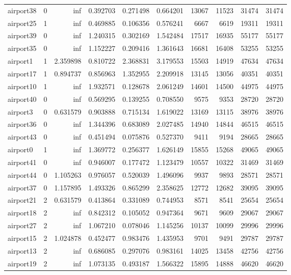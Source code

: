 \begin{longtable}{|l|r|r|r|r|r|r|r|r|r|}
airport38 & 0 & inf & 0.392703 & 0.271498 & 0.664201 & 13067 & 11523 & 31474 & 31474 \\
airport25 & 1 & inf & 0.469885 & 0.106356 & 0.576241 & 6667 & 6619 & 19311 & 19311 \\
airport39 & 0 & inf & 1.240315 & 0.302169 & 1.542484 & 17517 & 16935 & 55177 & 55177 \\
airport35 & 0 & inf & 1.152227 & 0.209416 & 1.361643 & 16681 & 16408 & 53255 & 53255 \\
airport1 & 1 & 2.359898 & 0.810722 & 2.368831 & 3.179553 & 15503 & 14919 & 47634 & 47634 \\
airport17 & 1 & 0.894737 & 0.856963 & 1.352955 & 2.209918 & 13145 & 13056 & 40351 & 40351 \\
airport10 & 1 & inf & 1.932571 & 0.128678 & 2.061249 & 14601 & 14500 & 44975 & 44975 \\
airport40 & 0 & inf & 0.569295 & 0.139255 & 0.708550 & 9575 & 9353 & 28720 & 28720 \\
airport3 & 0 & 0.631579 & 0.903888 & 0.715134 & 1.619022 & 13169 & 13115 & 38976 & 38976 \\
airport36 & 0 & inf & 1.344396 & 0.683089 & 2.027485 & 14940 & 14844 & 46515 & 46515 \\
airport43 & 0 & inf & 0.451494 & 0.075876 & 0.527370 & 9411 & 9194 & 28665 & 28665 \\
airport0 & 1 & inf & 1.369772 & 0.256377 & 1.626149 & 15855 & 15268 & 49065 & 49065 \\
airport41 & 0 & inf & 0.946007 & 0.177472 & 1.123479 & 10557 & 10322 & 31469 & 31469 \\
airport44 & 0 & 1.105263 & 0.976057 & 0.520039 & 1.496096 & 9937 & 9893 & 28571 & 28571 \\
airport37 & 0 & 1.157895 & 1.493326 & 0.865299 & 2.358625 & 12772 & 12682 & 39095 & 39095 \\
airport21 & 2 & 0.631579 & 0.413864 & 0.331089 & 0.744953 & 8571 & 8541 & 25654 & 25654 \\
airport18 & 2 & inf & 0.842312 & 0.105052 & 0.947364 & 9671 & 9609 & 29067 & 29067 \\
airport27 & 2 & inf & 1.067210 & 0.078046 & 1.145256 & 10137 & 10099 & 29996 & 29996 \\
airport15 & 2 & 1.024878 & 0.452477 & 0.983476 & 1.435953 & 9701 & 9491 & 29787 & 29787 \\
airport13 & 2 & inf & 0.686085 & 0.297076 & 0.983161 & 14025 & 13458 & 42756 & 42756 \\
airport19 & 2 & inf & 1.073135 & 0.493187 & 1.566322 & 15895 & 14888 & 46620 & 46620 \\

\end{longtable}

